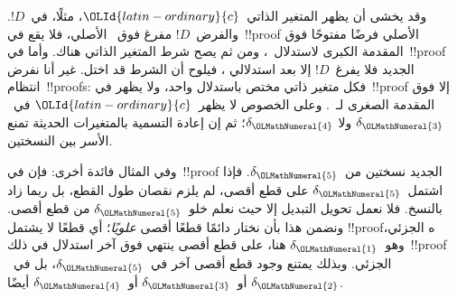\documentclass[../../../include/open-logic-section]{subfiles}
\begin{document}
وقد يخشى أن يظهر المتغير الذاتي~$\OLId{latin-ordinary}{c}$، مثلًا، في~$!D$. والفرض~$!D$ مفرغ
فوق~\Elim{\lexists} الأصلي، فلا يقع في~!!{proof} الأصلي فرضًا مفتوحًا
فوق المقدمة الكبرى لاستدلال~\Elim{\lexists}، ومن ثم يصح شرط المتغير
الذاتي هناك. وأما في~!!{proof} الجديد فلا يفرغ~$!D$ إلا بعد استدلالي
\Elim{\lexists}، فيلوح أن الشرط قد اختل. غير أنا نفرض انتظام~!!{proof}s:
فكل متغير ذاتي مختص باستدلال واحد، ولا يظهر في~!!{proof} إلا فوق المقدمة
الصغرى لـ~\Elim{\lexists}. وعلى الخصوص لا يظهر~$\OLId{latin-ordinary}{c}$ في~$\delta_\OLMathNumeral{3}$ ولا
$\delta_\OLMathNumeral{4}$؛ ثم إن إعادة التسمية بالمتغيرات الحديثة تمنع الأسر بين
النسختين.

وفي المثال فائدة أخرى: فإن في~!!{proof} الجديد نسختين من~$\delta_\OLMathNumeral{5}$.
فإذا اشتمل~$\delta_\OLMathNumeral{5}$ على قطع أقصى، لم يلزم نقصان طول القطع، بل ربما زاد
بالنسخ. فلا نعمل تحويل التبديل إلا حيث نعلم خلو~$\delta_\OLMathNumeral{5}$ من قطع أقصى.
ونضمن هذا بأن نختار دائمًا قطعًا أقصى \emph{علويًا}؛ أي قطعًا لا يشتمل
!!{proof}ه الجزئي، وهو~$\delta_\OLMathNumeral{1}$ هنا، على قطع أقصى ينتهي فوق آخر استدلال
في ذلك~!!{proof} الجزئي. وبذلك يمتنع وجود قطع أقصى آخر في~$\delta_\OLMathNumeral{5}$، بل
في~$\delta_\OLMathNumeral{2}$ أو~$\delta_\OLMathNumeral{3}$ أو~$\delta_\OLMathNumeral{4}$ أيضًا.
\end{document}
